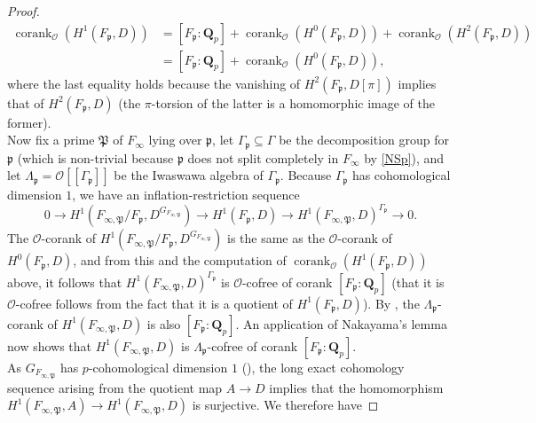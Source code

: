 \documentclass[12 pt]{amsart}
\theoremstyle{plain}
\theoremstyle{definition}
\numberwithin{equation}{section}
\numberwithin{table}{section}
\begin{document}
\begin{proof}
\begin{align*}
\operatorname{corank}_{\mathscr{O}}(H^1(F_\mathfrak{p},D))&=[F_\mathfrak{p}:\mathbf{Q}_p]+\operatorname{corank}_\mathscr{O}(H^0(F_\mathfrak{p},D))+\operatorname{corank}_\mathscr{O}(H^2(F_\mathfrak{p},D))\\
&=[F_\mathfrak{p}:\mathbf{Q}_p]
+\operatorname{corank}_\mathscr{O}(H^0(F_\mathfrak{p},D))\text{,}
\end{align*} 
where the last equality holds because the vanishing of $H^2(F_\mathfrak{p},D[\pi])$ implies that of $H^2(F_\mathfrak{p},D)$ (the $\pi$-torsion of the latter is a homomorphic image of the former).\\%
\indent Now fix a prime $\mathfrak{P}$ of $F_\infty$ lying over $\mathfrak{p}$, let $\Gamma_\mathfrak{p}\subseteq\Gamma$ be the decomposition group for $\mathfrak{p}$ (which is non-trivial because $\mathfrak{p}$ does not split completely in $F_\infty$ by \cref{NSp}), and let $\Lambda_\mathfrak{p}=\mathscr{O}[[\Gamma_\mathfrak{p}]]$ be the Iwaswawa algebra of $\Gamma_\mathfrak{p}$. Because $\Gamma_\mathfrak{p}$ has cohomological dimension $1$, we have an inflation-restriction sequence
\begin{equation*}
0\rightarrow H^1(F_{\infty,\mathfrak{P}}/F_\mathfrak{p},D^{G_{F_{\infty,\mathfrak{P}}}})\rightarrow H^1(F_\mathfrak{p},D)
\rightarrow H^1(F_{\infty,\mathfrak{P}},D)^{\Gamma_\mathfrak{p}}\rightarrow 0\text{.}
\end{equation*}
The $\mathscr{O}$-corank of $H^1(F_{\infty,\mathfrak{P}}/F_\mathfrak{p},D^{G_{F_{\infty,\mathfrak{P}}}})$ is the same as the $\mathscr{O}$-corank of $H^0(F_\mathfrak{p},D)$, and from this and the computation of $\operatorname{corank}_\mathscr{O}(H^1(F_\mathfrak{p},D))$ above, it follows that $H^1(F_{\infty,\mathfrak{P}},D)^{\Gamma_\mathfrak{p}}$ is $\mathscr{O}$-cofree of corank $[F_\mathfrak{p}:\mathbf{Q}_p]$ (that it is $\mathscr{O}$-cofree follows from the fact that it is a quotient of $H^1(F_\mathfrak{p},D)$). By \cite[Proposition 1]{GR89}, the $\Lambda_\mathfrak{p}$-corank of $H^1(F_{\infty,\mathfrak{P}},D)$ is also $[F_\mathfrak{p}:\mathbf{Q}_p]$. An application of Nakayama's lemma now shows that $H^1(F_{\infty,\mathfrak{P}},D)$ is $\Lambda_\mathfrak{p}$-cofree of corank $[F_\mathfrak{p}:\mathbf{Q}_p]$.\\%
\indent As $G_{F_{\infty,\mathfrak{P}}}$ has $p$-cohomological dimension $1$ (\cite[pg. 433]{Gr01}), the long exact cohomology sequence arising from the quotient map $A\to D$ implies that the homomorphism $H^1(F_{\infty,\mathfrak{P}},A)\rightarrow H^1(F_{\infty,\mathfrak{P}},D)$ is surjective. We therefore have

\end{proof}
\end{document}
